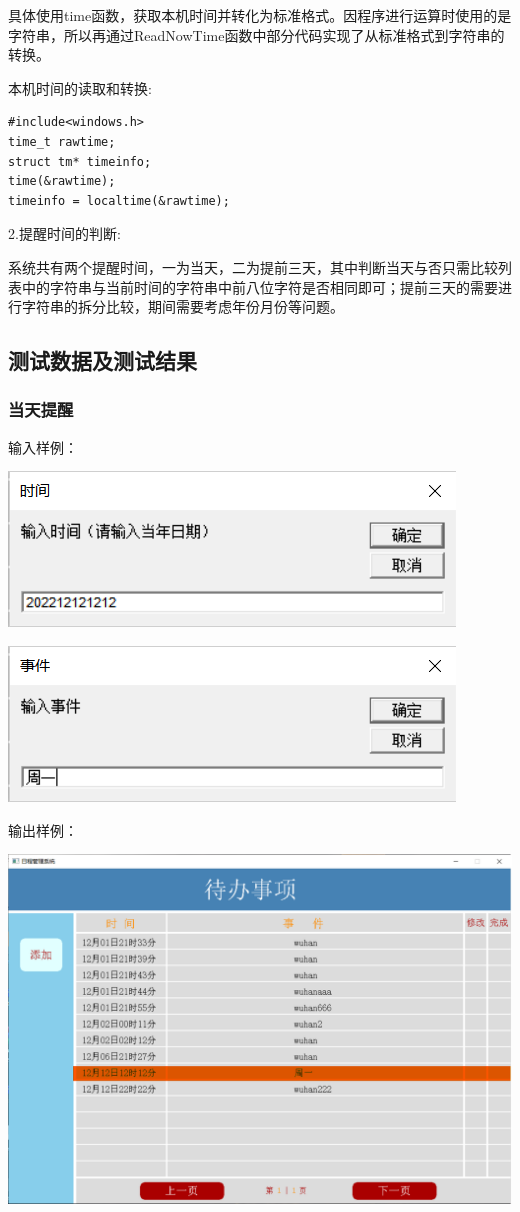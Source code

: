 \documentclass[UTF8]{article}
\begin{document}
具体使用time函数，获取本机时间并转化为标准格式。因程序进行运算时使用的是字符串，所以再通过ReadNowTime函数中部分代码实现了从标准格式到字符串的转换。

本机时间的读取和转换:
\begin{verbatim}
#include<windows.h>
time_t rawtime;
struct tm* timeinfo;
time(&rawtime);
timeinfo = localtime(&rawtime);
\end{verbatim}
2.提醒时间的判断:

系统共有两个提醒时间，一为当天，二为提前三天，其中判断当天与否只需比较列表中的字符串与当前时间的字符串中前八位字符是否相同即可；提前三天的需要进行字符串的拆分比较，期间需要考虑年份月份等问题。

\subsection{测试数据及测试结果}
\subsubsection{当天提醒}
输入样例：

\includegraphics[width=.5\textwidth]{4.0.png}

\includegraphics[width=.5\textwidth]{4.0.1.png}

输出样例：

\includegraphics[width=.8\textwidth]{4.1.0.png}
\end{document}
